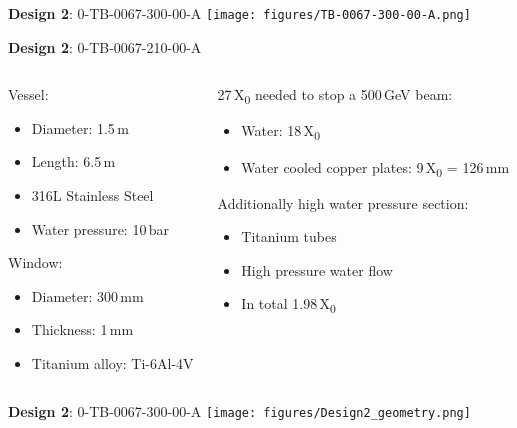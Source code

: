 \documentclass[xcolor={dvipsnames}]{beamer}
\begin{document}
\begin{frame}{\textbf{Design 2}: 0-TB-0067-300-00-A}
\centering
  \texttt{[image: figures/TB-0067-300-00-A.png]}
\end{frame}
{
\begin{frame}{\textbf{Design 2}: 0-TB-0067-210-00-A}
\begin{columns}
 \begin{column}{0.5\textwidth}
  Vessel:
  \begin{itemize}
   \item Diameter: 1.5\,m
   \item Length: 6.5\,m
   \item 316L Stainless Steel
   \item Water pressure: 10\,bar
  \end{itemize}
  Window:
  \begin{itemize}
   \item Diameter: 300\,mm
   \item Thickness: 1\,mm
   \item Titanium alloy: Ti-6Al-4V 
  \end{itemize}
 \end{column}
 \begin{column}{0.5\textwidth}
  27\,X\textsubscript{0} needed to stop a 500\,GeV beam:
  \begin{itemize}
   \item Water: 18\,X\textsubscript{0}
   \item Water cooled copper plates: 9\,X\textsubscript{0} = 126\,mm
  \end{itemize}  
    Additionally high water pressure section:
  \begin{itemize}
   \item Titanium tubes
   \item High pressure water flow
   \item In total 1.98\,X\textsubscript{0}
  \end{itemize} 
 \end{column}
\end{columns}

\end{frame}
}
\begin{frame}{\textbf{Design 2}: 0-TB-0067-300-00-A}
\centering
  \texttt{[image: figures/Design2\_geometry.png]}
\end{frame}
\end{document}

